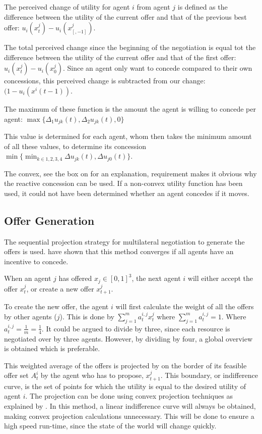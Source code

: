  The perceived change of utility for agent $i$ from agent $j$ is defined as the difference between the utility of the current offer and that of the previous best offer: $u_i(x^j_t)-u_i(x^j_{[,-1]})$.
 
 The total perceived change since the beginning of the negotiation is equal tot the difference between the utility of the current offer and that of the first offer: $u_i(x^j_t)-u_i(x^j_0)$. Since an agent only want to concede compared to their own concessions, this perceived change is subtracted from our change: $(1-u_i(x^i(t-1))$.
 
 The maximum of these function is the amount the agent is willing to concede per agent: $\max \{\Delta_1u_{jk}(t), \Delta_2u_{jk}(t),0\}$

This value is determined for each agent, whom then takes the minimum amount of all these values, to determine its concession $\min \{\displaystyle \min_{k\in 1, 2, 3, 4}\Delta u_{jk}(t), \Delta u_{j0}(t)\}$.

The convex, see the box on  for an explanation, requirement makes it obvious why the reactive concession can be used. If a non-convex utility function has been used, it could not have been determined whether an agent concedes if it moves. 



\subsection{Offer Generation}
\label{sec:des:offer}
The sequential projection strategy for multilateral negotiation to generate the offers is used. \citet{zheng2015automated} have shown that this method converges if all agents have an incentive to concede.

When an agent $j$ has offered $x_j\in[0,1]^3$, the next agent $i$ will either accept the offer $x^j_t$, or create a new offer $x^j_{t+1}$. 

To create the new offer, the agent $i$ will first calculate the weight of all the offers by other agents ($j$). This is done by $\sum_{j=1}^{m} a^{i,j}_t x^j_t $ where $\sum_{j=1}^{m}a^{i,j}_t = 1$. Where $a^{i,j}_t = \frac{1}{m} = \frac{1}{4}$. It could be argued to divide by three, since each resource is negotiated over by three agents. However, by dividing by four, a global overview is obtained which is preferable.

This weighted average of the offers is projected by on the border of its feasible offer set $A^i_t$ by the agent who has to propose, $x^j_{t+1}$. This boundary, or indifference curve, is the set of points for which the utility is equal to the desired utility of agent $i$. The projection can be done using convex projection techniques as explained by \citet{boyd2004convex}. In this method, a linear indifference curve will always be obtained, making convex projection calculations unnecessary. This will be done to ensure a high speed run-time, since the state of the world will change quickly.


